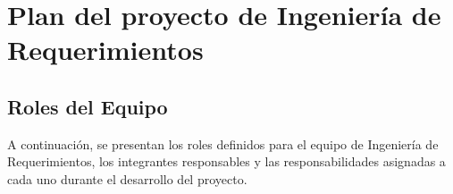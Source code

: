 \documentclass[11pt,a4paper]{article}
\begin{document}




\newpage
\appendix

\section{Plan del proyecto de Ingeniería de Requerimientos}
\subsection{Roles del Equipo}
A continuación, se presentan los roles definidos para el equipo de Ingeniería de Requerimientos, los integrantes responsables y las responsabilidades asignadas a cada uno durante el desarrollo del proyecto.
\end{document}
